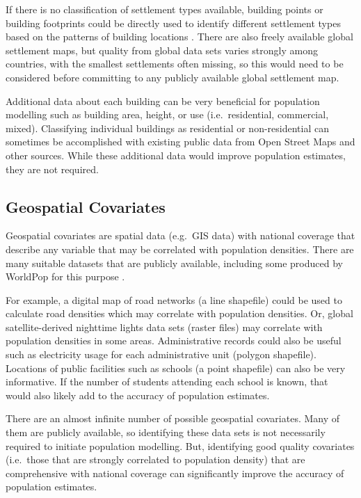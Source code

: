 \documentclass[]{book}
\begin{document}
If there is no classification of settlement types available, building
points or building footprints could be directly used to identify
different settlement types based on the patterns of building locations
\citep{jochem2020classifying, jochem2018identifying}. There are also
freely available global settlement maps, but quality from global data
sets varies strongly among countries, with the smallest settlements
often missing, so this would need to be considered before committing to
any publicly available global settlement map.

Additional data about each building can be very beneficial for
population modelling such as building area, height, or use
(i.e.~residential, commercial, mixed). Classifying individual buildings
as residential or non-residential
\citep{sturrock2018predicting, lloyd2020classifying} can sometimes be
accomplished with existing public data from Open Street Maps and other
sources. While these additional data would improve population estimates,
they are not required.

\subsection{Geospatial Covariates}\label{geospatial-covariates}

Geospatial covariates are spatial data (e.g.~GIS data) with national
coverage that describe any variable that may be correlated with
population densities. There are many suitable datasets that are publicly
available, including some produced by WorldPop for this purpose
\citep{lloyd2019global, dooley2020gridded}.

For example, a digital map of road networks (a line shapefile) could be
used to calculate road densities which may correlate with population
densities. Or, global satellite-derived nighttime lights data sets
(raster files) may correlate with population densities in some areas.
Administrative records could also be useful such as electricity usage
for each administrative unit (polygon shapefile). Locations of public
facilities such as schools (a point shapefile) can also be very
informative. If the number of students attending each school is known,
that would also likely add to the accuracy of population estimates.

There are an almost infinite number of possible geospatial covariates.
Many of them are publicly available, so identifying these data sets is
not necessarily required to initiate population modelling. But,
identifying good quality covariates (i.e.~those that are strongly
correlated to population density) that are comprehensive with national
coverage can significantly improve the accuracy of population estimates.
\end{document}
